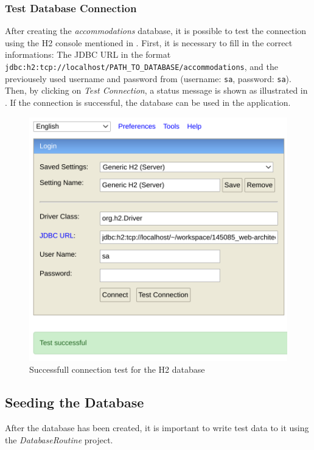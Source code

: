 \subsubsection{Test Database Connection}\label{sec:03_depl_h2_test}
After creating the \textit{accommodations} database, it is possible to test the connection using the H2 console mentioned in .
First, it is necessary to fill in the correct informations: The JDBC URL in the format \texttt{jdbc:h2:tcp://localhost/PATH\_TO\_DATABASE/accommodations}, and the previousely used username and password from  (username: \texttt{sa}, password: \texttt{sa}).
Then, by clicking on \textit{Test Connection}, a status message is shown as illustrated in . If the connection is successful, the database can be used in the application.
\begin{figure}[h]
\centering
\includegraphics[scale=0.3]{images/03_depl/h2_test}
\caption{Successfull connection test for the H2 database}
\label{fig:03_depl_createdb_h2test}
\end{figure}


\subsection{Seeding the Database}\label{sec:03_depl_seeddb}
After the database has been created, it is important to write test data to it using the \textit{DatabaseRoutine} project.

